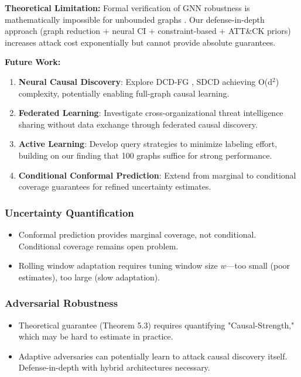 \documentclass[conference]{IEEEtran}
\begin{document}
\textbf{Theoretical Limitation:} Formal verification of GNN robustness is mathematically impossible for unbounded graphs \cite{gnn_verification}. Our defense-in-depth approach (graph reduction + neural CI + constraint-based + ATT\&CK priors) increases attack cost exponentially but cannot provide absolute guarantees.

\textbf{Future Work:} 
\begin{enumerate}
    \item \textbf{Neural Causal Discovery}: Explore DCD-FG \cite{dcdfg2022}, SDCD \cite{sdcd2024} achieving O(d$^2$) complexity, potentially enabling full-graph causal learning.
    
    \item \textbf{Federated Learning}: Investigate cross-organizational threat intelligence sharing without data exchange through federated causal discovery.
    
    \item \textbf{Active Learning}: Develop query strategies to minimize labeling effort, building on our finding that 100 graphs suffice for strong performance.
    
    \item \textbf{Conditional Conformal Prediction}: Extend from marginal to conditional coverage guarantees for refined uncertainty estimates.
\end{enumerate}

\subsubsection{Uncertainty Quantification}

\begin{itemize}
    \item Conformal prediction provides marginal coverage, not conditional. Conditional coverage remains open problem.
    \item Rolling window adaptation requires tuning window size $w$—too small (poor estimates), too large (slow adaptation).
\end{itemize}

\subsubsection{Adversarial Robustness}

\begin{itemize}
    \item Theoretical guarantee (Theorem 5.3) requires quantifying "Causal-Strength," which may be hard to estimate in practice.
    \item Adaptive adversaries can potentially learn to attack causal discovery itself. Defense-in-depth with hybrid architectures necessary.
\end{itemize}
\end{document}
